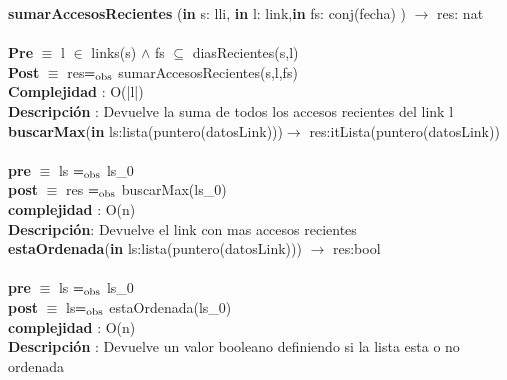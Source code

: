 	\textbf{sumarAccesosRecientes} (\textbf{in} s: lli, \textbf{in} l: link,\textbf{in} fs: conj(fecha) ) $\longrightarrow$ res: nat\\\\
	\textbf{Pre} $\equiv$ {l $\in$ links(s)  $\wedge$ fs $\subseteq$ diasRecientes(s,l)}\\
	\textbf{Post} $\equiv$ {res$=_{\mathrm{obs}}$ sumarAccesosRecientes(s,l,fs)}\\
	\textbf{Complejidad} : O(|l|)\\
	\textbf{Descripci\'{o}n} : Devuelve la suma de todos los accesos recientes del link l\\
	
	\textbf{buscarMax}(\textbf{in} ls:lista(puntero(datosLink)))$\longrightarrow$ res:itLista(puntero(datosLink))\\\\
	\textbf{pre} $\equiv$ {ls $=_{\mathrm{obs}}$ ls_{0}}\\
	\textbf{post} $\equiv$ {res $=_{\mathrm{obs}}$ buscarMax(ls_{0}) }\\
	\textbf{complejidad} : O(n)\\
	\textbf{Descripci\'{o}n}: Devuelve el link con mas accesos recientes\\
	
	\textbf{estaOrdenada}(\textbf{in} ls:lista(puntero(datosLink))) $\longrightarrow$ res:bool\\\\
	\textbf{pre} $\equiv$ {ls $=_{\mathrm{obs}}$ ls_{0}}\\
	\textbf{post} $\equiv$ {ls$=_{\mathrm{obs}}$ estaOrdenada(ls_{0})}\\
	\textbf{complejidad} : O(n)\\
	\textbf{Descripci\'{o}n} : Devuelve un valor booleano definiendo si la lista esta o no ordenada\\
	
	